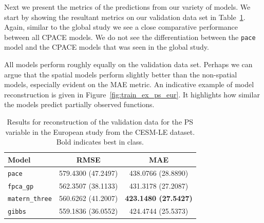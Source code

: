 Next we present the metrics of the predictions from our variety of models.
We start by showing the resultant metrics on our validation data set in Table~\ref{tab:train_cesm_ps_eur}.
Again, similar to the global study we see a close comparative performance between all CPACE models.
We do not see the differentiation between the \verb*|pace| model and the CPACE models that was seen in the global study.

All models perform roughly equally on the validation data set.
Perhaps we can argue that the spatial models perform slightly better than the non-spatial models, especially evident on the MAE metric.
An indicative example of model reconstruction is given in Figure~\ref{fig:train_ex_ps_eur}.
It highlights how similar the models predict partially observed functions. 

\begin{table}
	\caption[Results for PS variable on validation data in the European study]{Results for reconstruction of the validation data for the PS variable in the European study from the CESM-LE dataset. Bold indicates best in class.}
	\centering
	\label{tab:train_cesm_ps_eur}
	\begin{tabular}{lcc}
		\toprule
		\textbf{Model} & \textbf{RMSE} & \textbf{MAE} \\
		\midrule
		\verb*|pace| & 579.4300 (47.2497) & 438.0766 (28.8890) \\
		\verb*|fpca_gp| & 562.3507 (38.1133) & 431.3178 (27.2087) \\
		\verb*|matern_three| & 560.6262 (41.2007)& \textbf{423.1480 (27.5427)}\\
		\verb*|gibbs| & 559.1836 (36.0552) & 424.4744 (25.5373)\\
		\bottomrule
	\end{tabular}
\end{table}

